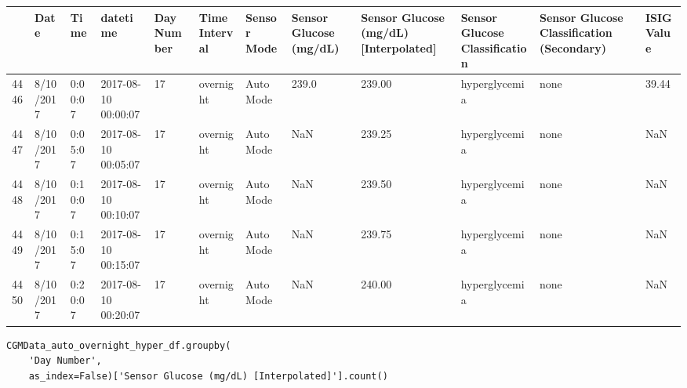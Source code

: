 \bigskip\noindent
\begin{tabular}{p{}p{}p{}p{}p{}p{}p{}p{}p{}p{}p{}p{}}
\toprule
 & Date & Time & datetime & Day Number & Time Interval & Sensor Mode & Sensor Glucose (mg/dL) & Sensor Glucose (mg/dL) [Interpolated] & Sensor Glucose Classification & Sensor Glucose Classification (Secondary) & ISIG Value \\
\hline
4446 & 8/10/2017 & 0:00:07 & 2017-08-10 00:00:07 & 17 & overnight & Auto Mode & 239.0 & 239.00 & hyperglycemia & none & 39.44 \\
\hline
4447 & 8/10/2017 & 0:05:07 & 2017-08-10 00:05:07 & 17 & overnight & Auto Mode & NaN & 239.25 & hyperglycemia & none & NaN \\
\hline
4448 & 8/10/2017 & 0:10:07 & 2017-08-10 00:10:07 & 17 & overnight & Auto Mode & NaN & 239.50 & hyperglycemia & none & NaN \\
\hline
4449 & 8/10/2017 & 0:15:07 & 2017-08-10 00:15:07 & 17 & overnight & Auto Mode & NaN & 239.75 & hyperglycemia & none & NaN \\
\hline
4450 & 8/10/2017 & 0:20:07 & 2017-08-10 00:20:07 & 17 & overnight & Auto Mode & NaN & 240.00 & hyperglycemia & none & NaN \\
\hline
\bottomrule
\end{tabular}

\bigskip

\begin{verbatim}
CGMData_auto_overnight_hyper_df.groupby(
    'Day Number', 
    as_index=False)['Sensor Glucose (mg/dL) [Interpolated]'].count()
\end{verbatim}

